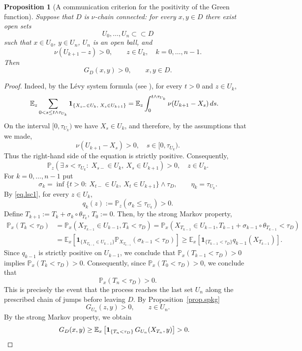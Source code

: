 \documentclass[11pt,a4paper,reqno]{amsart}
\newtheorem{proposition}[theorem]{\bf Proposition}
\theoremstyle{definition}
\numberwithin{equation}{section}
\begin{document}
\begin{proposition}[A communication criterion for the positivity of the Green function]
\label{prop.com1}
Suppose that $D$ is $\nu$-chain connected: for every
$x,y\in D$ there exist open sets
\[
U_0,\ldots,U_n\subset\subset D
\]
such that $x\in U_0$, $y\in U_n$, $U_n$ is an open ball, and
\[
\nu(U_{k+1}-z)>0,\qquad z\in U_k,\quad k=0,\ldots,n-1 .
\]
Then
\[
G_D(x,y)>0,\qquad x,y\in D .
\]
\end{proposition}
\begin{proof}
Indeed, by the L\'evy system formula (see \cite{IW}), for every $t>0$ and $z\in U_k$,
\[
\begin{split}
\mathbb E_z \sum_{0<s\leq t\wedge \tau_{U_k}} {\bf 1}_{\{X_{s-}\in U_k,\; X_s\in U_{k+1}\}}
&=
\mathbb E_z \int_0^{t\wedge \tau_{U_k}} \nu(U_{k+1}-X_s)\,ds .
\end{split}
\]
On the interval $[0,\tau_{U_k})$ we have
$X_s\in U_k$, and therefore, by the assumptions that we made,
\[
\nu(U_{k+1}-X_s)>0,\quad s\in [0,\tau_{U_k}).
\]
Thus the right-hand side of the equation is strictly positive. Consequently,
\begin{equation}
\label{eq.lsc1}
\mathbb P_z\left(\exists\, s<\tau_{U_k}:\; X_{s-}\in U_k,\ X_s\in {U_{k+1}}\right)>0,\quad z\in U_k.
\end{equation}
For $k=0,\ldots,n-1$
put
\[
\sigma_k=\inf\{t>0:\ X_{t-}\in U_k,\ X_t\in U_{k+1}\}\wedge\tau_D,\qquad \eta_k=\tau_{U_k}.
\]
By \eqref{eq.lsc1}, for every $z\in U_k$,
\[
q_k(z):=\mathbb P_z(\sigma_k\leq \tau_{U_k})>0 .
\]
Define $T_{k+1}:=T_k+\sigma_k\circ\theta_{T_k}$, $T_0:=0$.
Then, by the strong Markov property,
\[
\begin{split}
\mathbb P_x(T_k<\tau_D)&=\mathbb P_x(X_{T_{k-1}}\in U_{k-1},T_k<\tau_D)=\mathbb P_x(X_{T_{k-1}}\in U_{k-1},T_{k-1}+\sigma_{k-1}\circ\theta_{T_{k-1}}<\tau_D)
\\&=\mathbb E_x\left[\mathbf1_{\{X_{T_{k-1}}\in U_{k-1}\}}\mathbb P_{X_{T_{k-1}}}(\sigma_{k-1}<\tau_D)\right]\ge 
\mathbb E_x\left[\mathbf1_{\{T_{k-1}<\tau_D\}}q_{k-1}(X_{T_{k-1}})\right].
\end{split}
\]
Since $q_{k-1}$ is strictly positive on $U_{k-1}$, we conclude that $\mathbb P_x(T_{k-1}<\tau_D)>0$ implies $\mathbb P_x(T_{k}<\tau_D)>0$.
Consequently, since $\mathbb P_x(T_{0}<\tau_D)>0$, we conclude that 
\[
\mathbb P_x(T_{n}<\tau_D)>0.
\]
This is precisely the event that the process reaches the last set $U_n$
along the prescribed chain of jumps  before leaving $D$.
By Proposition~\ref{prop.spkg}
\[
G_{U_n}(z,y)>0,\qquad z\in U_n .
\]
By the strong Markov property, we obtain
\[
\begin{split}
G_D(x,y)&\ge\mathbb E_x\left[{\bf 1}_{\{T_n<\tau_D\}}\, G_{U_n}(X_{T_n},y)\right]>0.
\end{split}
\]
\end{proof}
\end{document}
